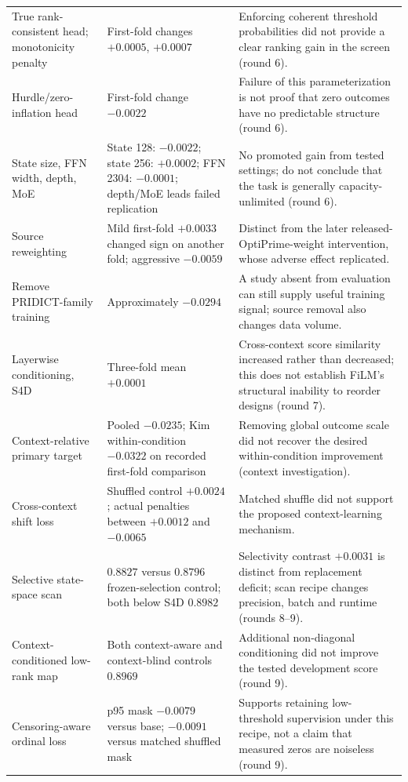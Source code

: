 \begin{longtable}{P{.23\linewidth}P{.28\linewidth}P{.40\linewidth}}
True rank-consistent head; monotonicity penalty & First-fold changes $+0.0005$, $+0.0007$ & Enforcing coherent threshold probabilities did not provide a clear ranking gain in the screen (round 6). \\
Hurdle/zero-inflation head & First-fold change $-0.0022$ & Failure of this parameterization is not proof that zero outcomes have no predictable structure (round 6). \\
State size, FFN width, depth, MoE & State 128: $-0.0022$; state 256: $+0.0002$; FFN 2304: $-0.0001$; depth/MoE leads failed replication & No promoted gain from tested settings; do not conclude that the task is generally capacity-unlimited (round 6). \\
Source reweighting & Mild first-fold $+0.0033$ changed sign on another fold; aggressive $-0.0059$ & Distinct from the later released-OptiPrime-weight intervention, whose adverse effect replicated. \\
Remove PRIDICT-family training & Approximately $-0.0294$ & A study absent from evaluation can still supply useful training signal; source removal also changes data volume. \\
Layerwise conditioning, S4D & Three-fold mean $+0.0001$ & Cross-context score similarity increased rather than decreased; this does not establish FiLM's structural inability to reorder designs (round 7). \\
Context-relative primary target & Pooled $-0.0235$; Kim within-condition $-0.0322$ on recorded first-fold comparison & Removing global outcome scale did not recover the desired within-condition improvement (context investigation). \\
Cross-context shift loss & Shuffled control $+0.0024$; actual penalties between $+0.0012$ and $-0.0065$ & Matched shuffle did not support the proposed context-learning mechanism. \\
Selective state-space scan & $0.8827$ versus $0.8796$ frozen-selection control; both below S4D $0.8982$ & Selectivity contrast $+0.0031$ is distinct from replacement deficit; scan recipe changes precision, batch and runtime (rounds 8--9). \\
Context-conditioned low-rank map & Both context-aware and context-blind controls $0.8969$ & Additional non-diagonal conditioning did not improve the tested development score (round 9). \\
Censoring-aware ordinal loss & p95 mask $-0.0079$ versus base; $-0.0091$ versus matched shuffled mask & Supports retaining low-threshold supervision under this recipe, not a claim that measured zeros are noiseless (round 9). \\
\end{longtable}

